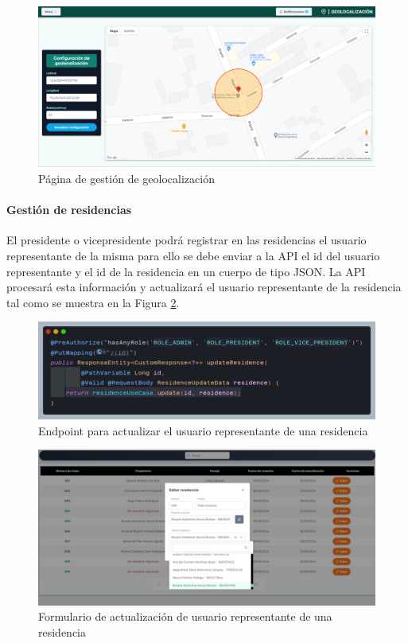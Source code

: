 \begin{figure}[H]
    \centering
    \includegraphics[width=1\textwidth]{resources/images/sw-geolocation}
    \caption{Página de gestión de geolocalización}
    \label{fig:sw-geolocation}
\end{figure}

\paragraph{Gestión de residencias}

El presidente o vicepresidente podrá registrar en las residencias el usuario representante de la misma para ello se debe enviar a la API el id del usuario representante y el id de la residencia en un cuerpo de tipo JSON.
La API procesará esta información y actualizará el usuario representante de la residencia tal como se muestra en la Figura \ref{fig:api-residence-update}.

\begin{figure}[H]
    \centering
    \includegraphics[width=1\textwidth]{resources/images/api-update-residence-endpoint}
    \caption{Endpoint para actualizar el usuario representante de una residencia}
    \label{fig:api-residence-update}
\end{figure}

\begin{figure}[H]
    \centering
    \includegraphics[width=1\textwidth]{resources/images/sw-residente-update}
    \caption{Formulario de actualización de usuario representante de una residencia}
    \label{fig:sw-residente-update}
\end{figure}

